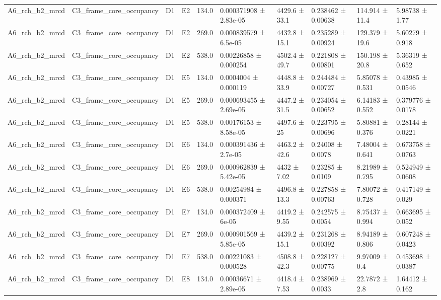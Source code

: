 \begin{table}
\begin{tabular}{llllllllll}
A6\_rch\_b2\_mrcd & C3\_frame\_core\_occupancy & D1 & E2 & 134.0 & 0.000371908 ± 2.83e-05 & 4429.6 ± 33.1 & 0.238462 ± 0.00638 & 114.914 ± 11.4 & 5.98738 ± 1.77 \\
A6\_rch\_b2\_mrcd & C3\_frame\_core\_occupancy & D1 & E2 & 269.0 & 0.000839579 ± 6.5e-05 & 4432.8 ± 15.1 & 0.235289 ± 0.00924 & 129.379 ± 19.6 & 5.60279 ± 0.918 \\
A6\_rch\_b2\_mrcd & C3\_frame\_core\_occupancy & D1 & E2 & 538.0 & 0.00226858 ± 0.000254 & 4502.4 ± 49.7 & 0.221808 ± 0.00801 & 150.198 ± 20.8 & 5.36319 ± 0.652 \\
A6\_rch\_b2\_mrcd & C3\_frame\_core\_occupancy & D1 & E5 & 134.0 & 0.0004004 ± 0.000119 & 4448.8 ± 33.9 & 0.244484 ± 0.00727 & 5.85078 ± 0.531 & 0.43985 ± 0.0546 \\
A6\_rch\_b2\_mrcd & C3\_frame\_core\_occupancy & D1 & E5 & 269.0 & 0.000693455 ± 2.69e-05 & 4447.2 ± 31.5 & 0.234054 ± 0.00652 & 6.14183 ± 0.552 & 0.379776 ± 0.0178 \\
A6\_rch\_b2\_mrcd & C3\_frame\_core\_occupancy & D1 & E5 & 538.0 & 0.00176153 ± 8.58e-05 & 4497.6 ± 25 & 0.223795 ± 0.00696 & 5.80881 ± 0.376 & 0.28144 ± 0.0221 \\
A6\_rch\_b2\_mrcd & C3\_frame\_core\_occupancy & D1 & E6 & 134.0 & 0.000391436 ± 2.7e-05 & 4463.2 ± 42.6 & 0.24008 ± 0.0078 & 7.48004 ± 0.641 & 0.673758 ± 0.0763 \\
A6\_rch\_b2\_mrcd & C3\_frame\_core\_occupancy & D1 & E6 & 269.0 & 0.000962839 ± 5.42e-05 & 4432 ± 7.02 & 0.23285 ± 0.0109 & 8.21989 ± 0.795 & 0.524949 ± 0.0608 \\
A6\_rch\_b2\_mrcd & C3\_frame\_core\_occupancy & D1 & E6 & 538.0 & 0.00254984 ± 0.000371 & 4496.8 ± 13.3 & 0.227858 ± 0.00763 & 7.80072 ± 0.728 & 0.417149 ± 0.029 \\
A6\_rch\_b2\_mrcd & C3\_frame\_core\_occupancy & D1 & E7 & 134.0 & 0.000372409 ± 6e-05 & 4419.2 ± 9.55 & 0.242575 ± 0.0054 & 8.75437 ± 0.994 & 0.663695 ± 0.052 \\
A6\_rch\_b2\_mrcd & C3\_frame\_core\_occupancy & D1 & E7 & 269.0 & 0.000901569 ± 5.85e-05 & 4439.2 ± 15.1 & 0.231268 ± 0.00392 & 8.94189 ± 0.806 & 0.607248 ± 0.0423 \\
A6\_rch\_b2\_mrcd & C3\_frame\_core\_occupancy & D1 & E7 & 538.0 & 0.00221083 ± 0.000528 & 4508.8 ± 42.3 & 0.228127 ± 0.00775 & 9.97009 ± 0.4 & 0.453698 ± 0.0387 \\
A6\_rch\_b2\_mrcd & C3\_frame\_core\_occupancy & D1 & E8 & 134.0 & 0.00036671 ± 2.89e-05 & 4418.4 ± 7.53 & 0.238969 ± 0.0033 & 22.7872 ± 2.8 & 1.64412 ± 0.162 \\

\end{tabular}
\end{table}

